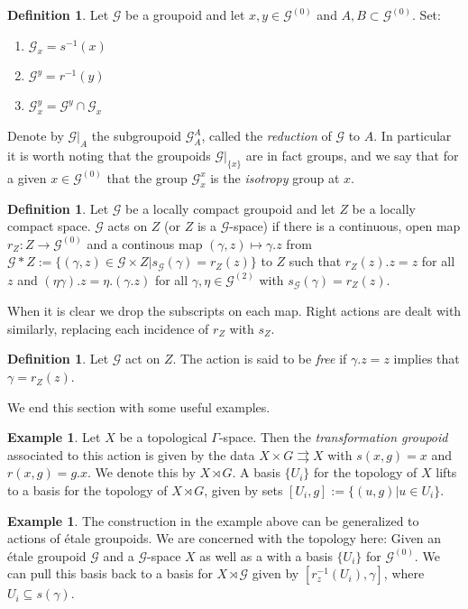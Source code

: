\documentclass[11pt,]{amsbook}
\theoremstyle{plain}
\theoremstyle{definition}%
\newtheorem{definition}[theorem]{Definition}%
\newtheorem{example}[theorem]{Example}%
\theoremstyle{remark}%
\newcommand{\G}{\mathcal{G}}
\begin{document}
\begin{definition}
Let $\G$ be a groupoid and let $x,y \in \G^{(0)}$ and $A,B \subset \G^{(0)}$. Set:
\begin{enumerate}
\item $\G_{x}=s^{-1}(x)$
\item $\G^{y}=r^{-1}(y)$
\item $\G^{y}_{x}=\G^{y} \cap \G_{x}$
\end{enumerate}
Denote by $\G|_{A}$ the subgroupoid $\G_{A}^{A}$, called the \textit{reduction} of $\G$ to $A$. In particular it is worth noting that the groupoids $\G|_{\lbrace x \rbrace}$ are in fact groups, and we say that for a given $x \in \G^{(0)}$ that the group $\G^{x}_{x}$ is the \textit{isotropy} group at $x$.
\end{definition}

\begin{definition}
Let $\G$ be a locally compact groupoid and let $Z$ be a locally compact space. $\G$ acts on $Z$ (or $Z$ is a $\G$-space) if there is a continuous, open map $r_{Z}: Z \rightarrow \G^{(0)}$ and a continous map $(\gamma, z) \mapsto \gamma .z$ from $\G \ast Z:= \lbrace (\gamma, z) \in \G \times Z | s_{\G}(\gamma)=r_{Z}(z)\rbrace$ to $Z$ such that $r_{Z}(z).z=z$ for all $z$ and $(\eta \gamma).z= \eta.(\gamma. z)$ for all $\gamma, \eta \in \G^{(2)}$ with $s_{\G}(\gamma)=r_{Z}(z)$.
\end{definition}

When it is clear we drop the subscripts on each map. Right actions are dealt with similarly, replacing each incidence of $r_{Z}$ with $s_{Z}$.

\begin{definition}
Let $\G$ act on $Z$. The action is said to be \textit{free} if $\gamma.z=z$ implies that $\gamma = r_{Z}(z)$.
\end{definition}
We end this section with some useful examples.

\begin{example}\label{Ex:TransGrp}
Let $X$ be a topological $\Gamma$-space. Then the \textit{transformation groupoid} associated to this action is given by the data $X \times G \rightrightarrows X$ with $s(x,g)=x$ and $r(x,g)=g.x$. We denote this by $X \rtimes G$. A basis $\lbrace U_{i} \rbrace$ for the topology of $X$ lifts to a basis for the topology of $X \rtimes G$, given by sets $[U_{i},g]:=\lbrace (u,g) | u \in U_{i} \rbrace$. 
\end{example}

\begin{example}
The construction in the example above can be generalized to actions of \'etale groupoids. We are concerned with the topology here: Given an \'etale groupoid $\G$ and a $\G$-space $X$ as well as a with a basis $\lbrace U_{i} \rbrace$ for $\G^{(0)}$. We can pull this basis back to a basis for $X \rtimes \G$ given by $[r_{z}^{-1}(U_{i}),\gamma]$, where $U_{i} \subseteq s(\gamma)$.
\end{example}
\end{document}
